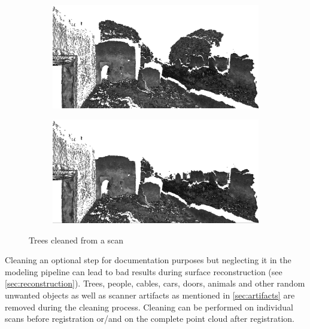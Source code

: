 \begin{figure}[ht]
	\begin{subfigure}[b]{.5\textwidth}
	  \centering
	  \includegraphics[width=.9\linewidth]{images/dirty}
	\end{subfigure}%
	\begin{subfigure}[b]{.5\textwidth}
	  \centering
	  \includegraphics[width=.9\linewidth]{images/clean}
	\end{subfigure}
  \caption{Trees cleaned from a scan}
  \label{fig:cleaning}
\end{figure}

Cleaning an optional step for documentation purposes but neglecting it in the modeling pipeline can lead to bad results during surface reconstruction (see \autoref{sec:reconstruction}). Trees, people, cables, cars, doors, animals and other random unwanted objects as well as scanner artifacts as mentioned in \autoref{sec:artifacts} are removed during the cleaning process. Cleaning can be performed on individual scans before registration or/and on the complete point cloud after registration.

